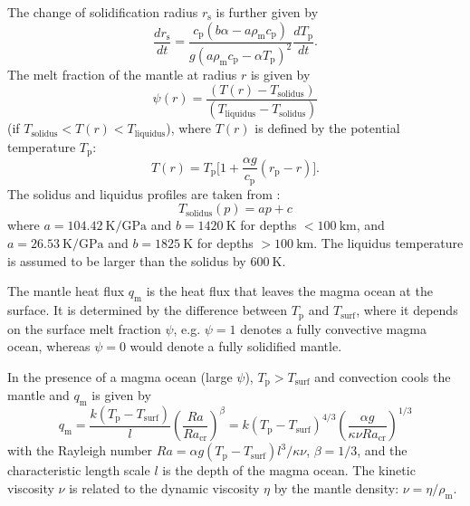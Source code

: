 \documentclass[paper=letterpaper,fontsize=12pt,oneside,twocolumn]{article}
\newcommand{\eg}{e.g. }
\begin{document}
The change of solidification radius $r_\mathrm{s}$ is further given by
\begin{equation}
	\label{Deriv_rsol}
	\frac{dr_\mathrm{s}}{dt} = \frac{c_\mathrm{p} (b \alpha - a \rho_\mathrm{m} c_\mathrm{p})}{g (a \rho_\mathrm{m} c_\mathrm{p} - \alpha T_\mathrm{p})^2} \frac{dT_\mathrm{p}}{dt}.
\end{equation}
The melt fraction of the mantle at radius $r$ is given by 
\begin{equation}
\psi (r) = \frac{(T(r) - T_\mathrm{solidus}) }{ ( T_\mathrm{liquidus} -  T_\mathrm{solidus}) }
\end{equation}
(if $T_\mathrm{solidus} < T(r) < T_\mathrm{liquidus}$), where $T(r)$ is defined by the potential temperature $T_\mathrm{p}$:
\begin{equation}
\label{adiabatic}
T(r) = T_\mathrm{p} \lbrack 1 + \frac{\alpha g}{c_\mathrm{p}} (r_\mathrm{p} - r) \rbrack.
\end{equation}
The solidus and liquidus profiles are taken from \citet{Hirschmann2000}:
\begin{equation}
    T_\mathrm{solidus}(p) = a p + c
\end{equation}
where $a = \SI{104.42}{\kelvin\per\giga\pascal}$ and $b = \SI{1420}{\kelvin}$ for depths ${< \SI{100}{\kilo\metre}}$, and $a = \SI{26.53}{\kelvin\per\giga\pascal}$ and $b = \SI{1825}{\kelvin}$ for depths ${> \SI{100}{\kilo\metre}}$.
The liquidus temperature is assumed to be larger than the solidus by $\SI{600}{\kelvin}$.

The mantle heat flux $q_\mathrm{m}$ is the heat flux that leaves the magma ocean at the surface. It is determined by the difference between $T_\mathrm{p}$ and $T_\mathrm{surf}$, where it depends on the surface melt fraction $\psi$, \eg $\psi=1$ denotes a fully convective magma ocean, whereas  $\psi=0$ would denote a fully solidified mantle.

In the presence of a magma ocean (large $\psi$), $T_\mathrm{p} > T_\mathrm{surf}$ and convection cools the mantle and $q_\mathrm{m}$ is given by
\begin{equation}
	\label{Eq_ManHeatFlux}
	q_\mathrm{m} = \frac{k (T_\mathrm{p} - T_\mathrm{surf})}{l} \left( \frac{Ra}{Ra_\mathrm{cr}}  \right)^\beta = k (T_\mathrm{p} - T_\mathrm{surf})^{4/3} \left( \frac{\alpha g}{\kappa \nu Ra_\mathrm{cr}} \right)^{1/3}
\end{equation}
with the Rayleigh number $Ra = \alpha g (T_\mathrm{p} - T_\mathrm{surf}) l^3 / \kappa \nu$, $\beta = 1/3$, and the characteristic length scale $l$ is the depth of the magma ocean. The kinetic viscosity $\nu$ is related to the dynamic viscosity $\eta$ by the mantle density: $\nu = \eta / \rho_\mathrm{m}$.
\end{document}
